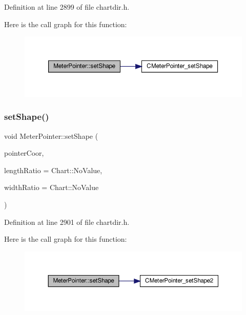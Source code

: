Definition at line 2899 of file chartdir.\+h.

Here is the call graph for this function\+:
\nopagebreak
\begin{figure}[H]
\begin{center}
\leavevmode
\includegraphics[width=350pt]{class_meter_pointer_a597012c2677c3f1f05501ae8ce7ea743_cgraph}
\end{center}
\end{figure}
\mbox{\label{class_meter_pointer_a3dd157f4c0eb3c42567d90fa38ab1d0a}} 
\subsubsection{\texorpdfstring{set\+Shape()}{setShape()}\hspace{0.1cm}{\footnotesize\ttfamily [2/2]}}
{\footnotesize\ttfamily void Meter\+Pointer\+::set\+Shape (\begin{DoxyParamCaption}\item[{\hyperlink{class_int_array}{Int\+Array}}]{pointer\+Coor,  }\item[{double}]{length\+Ratio = {\ttfamily Chart\+:\+:NoValue},  }\item[{double}]{width\+Ratio = {\ttfamily Chart\+:\+:NoValue} }\end{DoxyParamCaption})\hspace{0.3cm}{\ttfamily [inline]}}



Definition at line 2901 of file chartdir.\+h.

Here is the call graph for this function\+:
\nopagebreak
\begin{figure}[H]
\begin{center}
\leavevmode
\includegraphics[width=350pt]{class_meter_pointer_a3dd157f4c0eb3c42567d90fa38ab1d0a_cgraph}
\end{center}
\end{figure}
\mbox{\label{class_meter_pointer_abfea6d66197a40b67d984137034bb393}} 
